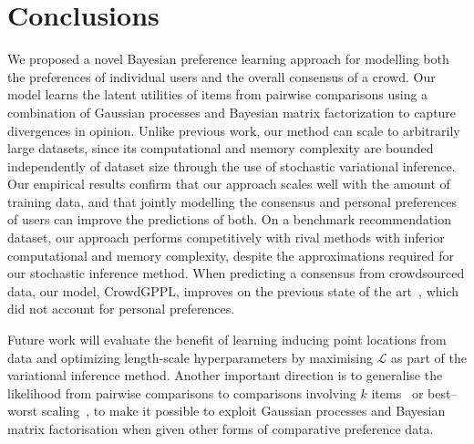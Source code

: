 \section{Conclusions}

We proposed a novel Bayesian preference learning approach 
for modelling both the preferences of individual users 
and the overall consensus of a crowd. 
Our model learns the latent utilities of items from pairwise comparisons 
using a combination of Gaussian processes and Bayesian matrix factorization 
to capture divergences in opinion.
Unlike previous work, our method can scale to arbitrarily large datasets,
since its computational and memory complexity  are bounded independently of dataset size
through the use of stochastic variational inference.
Our empirical results confirm that our approach scales well with the amount of training data,
and that jointly modelling the consensus and personal preferences of users can improve the predictions
of both.
On a benchmark recommendation dataset, our approach performs competitively
with rival methods with inferior computational and memory complexity,
despite the approximations required for our stochastic inference method.
When predicting a consensus from crowdsourced data, our model, CrowdGPPL, improves on 
the previous state of the art~\citep{simpson2018finding},
which did not account for personal preferences.

Future work will evaluate the benefit of learning inducing point locations from data and
optimizing length-scale hyperparameters by maximising $\mathcal L$ as part of the variational inference method.
Another important direction is to generalise the likelihood from pairwise comparisons
to comparisons involving $k$ items~\cite{pan2018stagewise}
or best--worst scaling~\citep{kiritchenko2017best},
to make it possible to exploit Gaussian processes and Bayesian matrix factorisation
when given other forms of comparative preference data.
